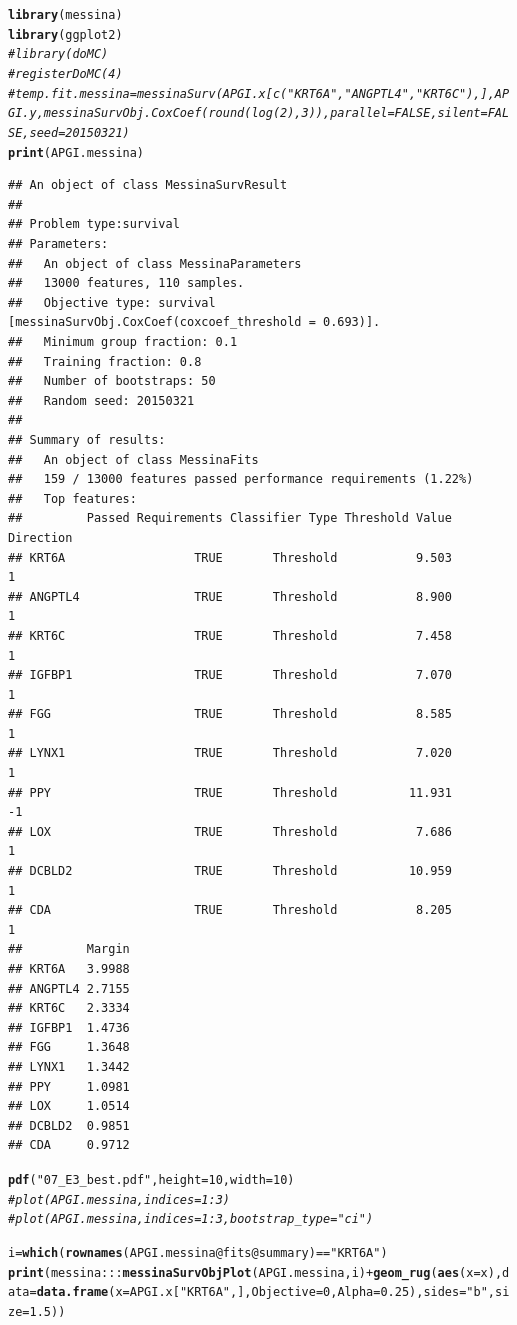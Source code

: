 \documentclass{article}\usepackage[]{graphicx}\usepackage[]{color}
\makeatletter
\newcommand{\hlnum}[1]{\textcolor[rgb]{0.686,0.059,0.569}{#1}}%
\newcommand{\hlstr}[1]{\textcolor[rgb]{0.192,0.494,0.8}{#1}}%
\newcommand{\hlcom}[1]{\textcolor[rgb]{0.678,0.584,0.686}{\textit{#1}}}%
\newcommand{\hlopt}[1]{\textcolor[rgb]{0,0,0}{#1}}%
\newcommand{\hlstd}[1]{\textcolor[rgb]{0.345,0.345,0.345}{#1}}%
\newcommand{\hlkwb}[1]{\textcolor[rgb]{0.69,0.353,0.396}{#1}}%
\newcommand{\hlkwc}[1]{\textcolor[rgb]{0.333,0.667,0.333}{#1}}%
\newcommand{\hlkwd}[1]{\textcolor[rgb]{0.737,0.353,0.396}{\textbf{#1}}}%
\newenvironment{kframe}{%
 \def\at@end@of@kframe{}%
 \ifinner\ifhmode%
  \def\at@end@of@kframe{\end{minipage}}%
  \begin{minipage}{\columnwidth}%
 \fi\fi%
 \def\FrameCommand##1{\hskip\@totalleftmargin \hskip-\fboxsep
 \colorbox{shadecolor}{##1}\hskip-\fboxsep
     \hskip-\linewidth \hskip-\@totalleftmargin \hskip\columnwidth}%
 \MakeFramed {\advance\hsize-\width
   \@totalleftmargin\z@ \linewidth\hsize
   \@setminipage}}%
 {\par\unskip\endMakeFramed%
 \at@end@of@kframe}
\newenvironment{knitrout}{}{} %
\makeatother
\begin{document}
\begin{knitrout}
\color{fgcolor}\begin{kframe}
\begin{alltt}
\hlkwd{library}\hlstd{(messina)}
\hlkwd{library}\hlstd{(ggplot2)}
\hlcom{# library(doMC)}
\hlcom{# registerDoMC(4)}
\hlcom{# temp.fit.messina = messinaSurv(APGI.x[c("KRT6A", "ANGPTL4", "KRT6C"),], APGI.y, messinaSurvObj.CoxCoef(round(log(2), 3)), parallel = FALSE, silent = FALSE, seed = 20150321)}
\hlkwd{print}\hlstd{(APGI.messina)}
\end{alltt}
\begin{verbatim}
## An object of class MessinaSurvResult
## 
## Problem type:survival
## Parameters:
##   An object of class MessinaParameters
##   13000 features, 110 samples.
##   Objective type: survival [messinaSurvObj.CoxCoef(coxcoef_threshold = 0.693)].
##   Minimum group fraction: 0.1
##   Training fraction: 0.8
##   Number of bootstraps: 50
##   Random seed: 20150321
## 
## Summary of results:
##   An object of class MessinaFits
##   159 / 13000 features passed performance requirements (1.22%)
##   Top features:
##         Passed Requirements Classifier Type Threshold Value Direction
## KRT6A                  TRUE       Threshold           9.503         1
## ANGPTL4                TRUE       Threshold           8.900         1
## KRT6C                  TRUE       Threshold           7.458         1
## IGFBP1                 TRUE       Threshold           7.070         1
## FGG                    TRUE       Threshold           8.585         1
## LYNX1                  TRUE       Threshold           7.020         1
## PPY                    TRUE       Threshold          11.931        -1
## LOX                    TRUE       Threshold           7.686         1
## DCBLD2                 TRUE       Threshold          10.959         1
## CDA                    TRUE       Threshold           8.205         1
##         Margin
## KRT6A   3.9988
## ANGPTL4 2.7155
## KRT6C   2.3334
## IGFBP1  1.4736
## FGG     1.3648
## LYNX1   1.3442
## PPY     1.0981
## LOX     1.0514
## DCBLD2  0.9851
## CDA     0.9712
\end{verbatim}
\begin{alltt}
\hlkwd{pdf}\hlstd{(}\hlstr{"07_E3_best.pdf"}\hlstd{,} \hlkwc{height} \hlstd{=} \hlnum{10}\hlstd{,} \hlkwc{width} \hlstd{=} \hlnum{10}\hlstd{)}
\hlcom{# plot(APGI.messina, indices = 1:3)}
\hlcom{# plot(APGI.messina, indices = 1:3, bootstrap_type = "ci")}

\hlstd{i} \hlkwb{=} \hlkwd{which}\hlstd{(}\hlkwd{rownames}\hlstd{(APGI.messina}\hlopt{@}\hlkwc{fits}\hlopt{@}\hlkwc{summary}\hlstd{)} \hlopt{==} \hlstr{"KRT6A"}\hlstd{)}
\hlkwd{print}\hlstd{(messina}\hlopt{:::}\hlkwd{messinaSurvObjPlot}\hlstd{(APGI.messina, i)} \hlopt{+} \hlkwd{geom_rug}\hlstd{(}\hlkwd{aes}\hlstd{(}\hlkwc{x} \hlstd{= x),} \hlkwc{data} \hlstd{=} \hlkwd{data.frame}\hlstd{(}\hlkwc{x} \hlstd{= APGI.x[}\hlstr{"KRT6A"}\hlstd{,],} \hlkwc{Objective} \hlstd{=} \hlnum{0}\hlstd{,} \hlkwc{Alpha} \hlstd{=} \hlnum{0.25}\hlstd{),} \hlkwc{sides} \hlstd{=} \hlstr{"b"}\hlstd{,} \hlkwc{size} \hlstd{=} \hlnum{1.5}\hlstd{))}
\end{alltt}



\end{kframe}
\end{knitrout}
\end{document}
